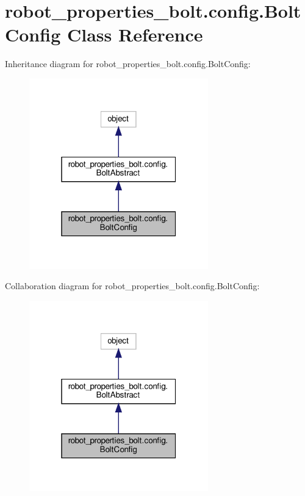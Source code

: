 \hypertarget{classrobot__properties__bolt_1_1config_1_1BoltConfig}{}\section{robot\+\_\+properties\+\_\+bolt.\+config.\+Bolt\+Config Class Reference}
\label{classrobot__properties__bolt_1_1config_1_1BoltConfig}


Inheritance diagram for robot\+\_\+properties\+\_\+bolt.\+config.\+Bolt\+Config\+:
\nopagebreak
\begin{figure}[H]
\begin{center}
\leavevmode
\includegraphics[width=220pt]{classrobot__properties__bolt_1_1config_1_1BoltConfig__inherit__graph}
\end{center}
\end{figure}


Collaboration diagram for robot\+\_\+properties\+\_\+bolt.\+config.\+Bolt\+Config\+:
\nopagebreak
\begin{figure}[H]
\begin{center}
\leavevmode
\includegraphics[width=220pt]{classrobot__properties__bolt_1_1config_1_1BoltConfig__coll__graph}
\end{center}
\end{figure}
